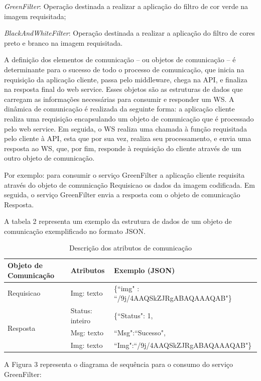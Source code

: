 \documentclass[12pt]{article}
\begin{document}
\textit{GreenFilter}: Operação destinada a realizar a aplicação do filtro de cor verde na imagem requisitada;

\textit{BlackAndWhiteFilter}: Operação destinada a realizar a aplicação do filtro de cores preto e branco na imagem requisitada.

A definição dos elementos de comunicação – ou objetos de comunicação – é
determinante para o sucesso de todo o processo de comunicação, que inicia na requisição da aplicação cliente, passa pelo middleware, chega na API, e finaliza na resposta final do web service. Esses objetos são as estruturas de dados que carregam as informações necessárias para consumir e responder um WS.
A dinâmica de comunicação é realizada da seguinte forma: a aplicação cliente realiza uma requisição encapsulando um objeto de comunicação que é processado pelo web service. Em seguida, o WS realiza uma chamada à função requisitada pelo cliente à API, esta que por sua vez, realiza seu processamento, e envia uma resposta ao WS, que, por fim, responde à requisição do cliente através de um outro objeto de comunicação.

Por exemplo: para consumir o serviço GreenFilter a aplicação cliente requisita através do objeto de comunicação Requisicao os dados da imagem codificada. Em seguida, o serviço GreenFilter envia a resposta com o objeto de comunicação Resposta.

A tabela 2 representa um exemplo da estrutura de dados de um objeto de
comunicação exemplificado no formato JSON.

\begin{table}[ht]
	\centering
	\caption{Descrição dos atributos de comunicação}
	\label{tab:Table2}
	\smallskip
	\begin{tabular}{ |l|l|l| }
		\hline
		Objeto de Comunicação & Atributos & Exemplo (JSON) \\ \hline
		Requisicao & Img: texto & \{“img" : “/9j/4AAQSkZJRgABAQAAAQAB"\} \\ \hline
		\multirow{3}{*}{Resposta} & Status: inteiro & \{“Status": 1, \\
		& Msg: texto & “Msg":“Sucesso", \\
		& Img: texto & “Img":“/9j/4AAQSkZJRgABAQAAAQAB"\} \\
		\hline
	\end{tabular}
\end{table}

A Figura 3 representa o diagrama de sequência para o consumo do serviço GreenFilter:
\end{document}
